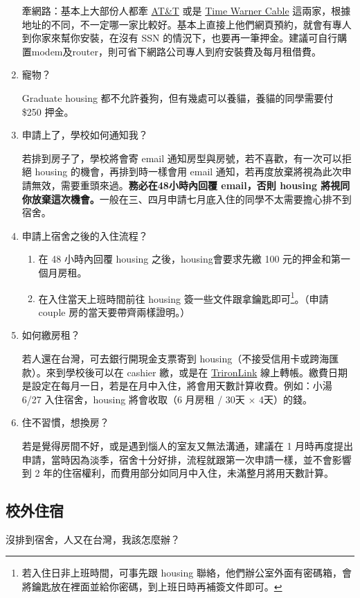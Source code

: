 \documentclass[10pt,a4paper]{book}
\begin{document}
\begin{CJK}{UTF8}{bkai}
\begin{enumerate}
牽網路：基本上大部份人都牽 \href{http://www.att.com/}{AT\&T} 或是 \href{http://www.timewarnercable.com/}{Time Warner Cable} 這兩家，根據地址的不同，不一定哪一家比較好。基本上直接上他們網頁預約，就會有專人到你家來幫你安裝，在沒有 SSN 的情況下，也要再一筆押金。建議可自行購置modem及router，則可省下網路公司專人到府安裝費及每月租借費。

\item 寵物？

Graduate housing 都不允許養狗，但有幾處可以養貓，養貓的同學需要付 \$250 押金。

\item 申請上了，學校如何通知我？

若排到房子了，學校將會寄 email 通知房型與房號，若不喜歡，有一次可以拒絕 housing 的機會，再排到時一樣會用 email 通知，若再度放棄將視為此次申請無效，需要重頭來過。\textbf{務必在48小時內回覆 email，否則 housing 將視同你放棄這次機會。}一般在三、四月申請七月底入住的同學不太需要擔心排不到宿舍。

\item 申請上宿舍之後的入住流程？
    \begin{enumerate}
    \item 在 48 小時內回覆 housing 之後，housing會要求先繳 100 元的押金和第一個月房租。
    \item 在入住當天上班時間前往 housing 簽一些文件跟拿鑰匙即可\footnote{若入住日非上班時間，可事先跟 housing 聯絡，他們辦公室外面有密碼箱，會將鑰匙放在裡面並給你密碼，到上班日時再補簽文件即可。}。（申請 couple 房的當天要帶齊兩樣證明。）
    \end{enumerate}
    
\item 如何繳房租？

若人還在台灣，可去銀行開現金支票寄到 housing（不接受信用卡或跨海匯款）。來到學校後可以在 cashier 繳，或是在 \href{http://students.ucsd.edu}{TrironLink} 線上轉帳。繳費日期是設定在每月一日，若是在月中入住，將會用天數計算收費。例如：小湯 6/27 入住宿舍，housing 將會收取（6 月房租 / 30天 $\times$ 4天）的錢。

\item 住不習慣，想換房？

若是覺得房間不好，或是遇到惱人的室友又無法溝通，建議在 1 月時再度提出申請，當時因為淡季，宿舍十分好排，流程就跟第一次申請一樣，並不會影響到 2 年的住宿權利，而費用部分如同月中入住，未滿整月將用天數計算。
\end{enumerate}

\subsection{校外住宿}
沒排到宿舍，人又在台灣，我該怎麼辦？


\end{CJK}
\end{document}
